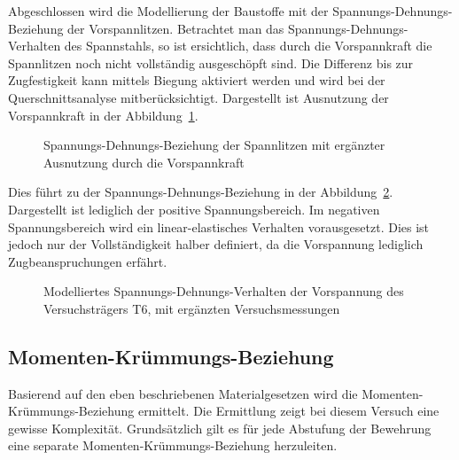 \documentclass[
  11pt,
  letterpaper,
]{scrreprt}
\begin{document}
Abgeschlossen wird die Modellierung der Baustoffe mit der
Spannungs-Dehnungs-Beziehung der Vorspannlitzen. Betrachtet man das
Spannungs-Dehnungs-Verhalten des Spannstahls, so ist ersichtlich, dass
durch die Vorspannkraft die Spannlitzen noch nicht vollständig
ausgeschöpft sind. Die Differenz bis zur Zugfestigkeit kann mittels
Biegung aktiviert werden und wird bei der Querschnittsanalyse
mitberücksichtigt. Dargestellt ist Ausnutzung der Vorspannkraft in der
Abbildung~\ref{fig-ausnutzung_sigma_p}.

\begin{figure}[H]


\caption{\label{fig-ausnutzung_sigma_p}Spannungs-Dehnungs-Beziehung der
Spannlitzen mit ergänzter Ausnutzung durch die Vorspannkraft}

\end{figure}%

Dies führt zu der Spannungs-Dehnungs-Beziehung in der
Abbildung~\ref{fig-sigma_eps_vorspannung_t6}. Dargestellt ist lediglich
der positive Spannungsbereich. Im negativen Spannungsbereich wird ein
linear-elastisches Verhalten vorausgesetzt. Dies ist jedoch nur der
Vollständigkeit halber definiert, da die Vorspannung lediglich
Zugbeanspruchungen erfährt.

\begin{figure}[H]


\caption{\label{fig-sigma_eps_vorspannung_t6}Modelliertes
Spannungs-Dehnungs-Verhalten der Vorspannung des Versuchsträgers T6, mit
ergänzten Versuchsmessungen}

\end{figure}%

\subsection{Momenten-Krümmungs-Beziehung}\label{momenten-kruxfcmmungs-beziehung}

Basierend auf den eben beschriebenen Materialgesetzen wird die
Momenten-Krümmungs-Beziehung ermittelt. Die Ermittlung zeigt bei diesem
Versuch eine gewisse Komplexität. Grundsätzlich gilt es für jede
Abstufung der Bewehrung eine separate Momenten-Krümmungs-Beziehung
herzuleiten.
\end{document}
